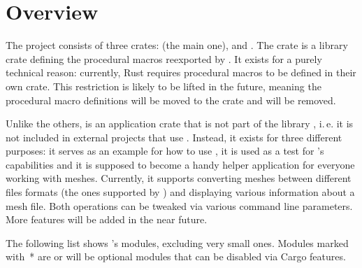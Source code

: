 \section{Overview}

The project consists of three crates:  (the main one),  and .
The crate  is a library crate defining the procedural macros reexported by .
It exists for a purely technical reason: currently, Rust requires procedural macros to be defined in their own crate.
This restriction is likely to be lifted in the future, meaning the procedural macro definitions will be moved to the crate  and  will be removed.

Unlike the others,  is an application crate that is not part of the library , i.\,e. it is not included in external projects that use .
Instead, it exists for three different purposes: it serves as an example for how to use , it is used as a test for 's capabilities and it is supposed to become a handy helper application for everyone working with meshes.
Currently, it supports converting meshes between different files formats (the ones supported by ) and displaying various information about a mesh file.
Both operations can be tweaked via various command line parameters.
More features will be added in the near future.

The following list shows 's modules, excluding very small ones.
Modules marked with~* are or will be optional modules that can be disabled via Cargo features.

